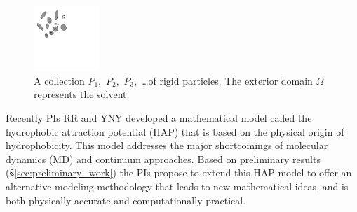 \begin{figure}
\centerline{\includegraphics[width=0.22\textwidth]{figures/BG_fig1.pdf}}
\caption{ \footnotesize
A collection $P_1,$ $P_2,$ $P_3,$ \dots of rigid particles. The exterior domain
$\Omega$ represents the solvent.}
  \label{fig:domain}
\end{figure}
Recently PIs RR and YNY developed a mathematical model called the
hydrophobic attraction potential (HAP) \cite{Fu2018_SIAM} that is based
on the physical origin of hydrophobicity.  This model addresses the
major shortcomings of molecular dynamics (MD) and continuum approaches.
Based on preliminary results (\S\ref{sec:preliminary_work}) the PIs
propose to extend this HAP model to offer an alternative modeling
methodology that leads to new mathematical ideas, and is both physically
accurate and computationally practical.
%
%
%
%
